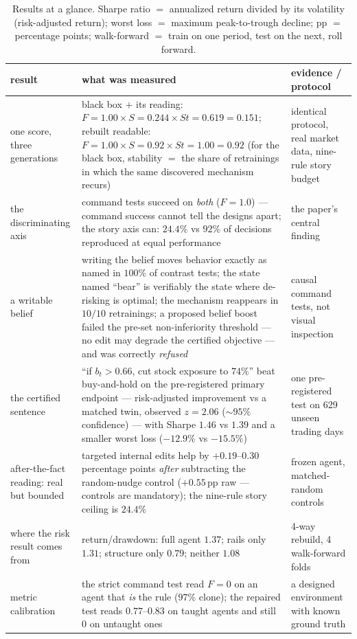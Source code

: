 \documentclass[11pt]{article}
\begin{document}
\begin{table}[h]
\centering\footnotesize
\begin{tabular}{p{3.7cm}p{6.4cm}p{4.0cm}}
\toprule
result & what was measured & evidence / protocol \\
\midrule
one score, three generations & black box $+$ its reading: $F{=}1.00 \times S{=}0.244
\times S\!t{=}0.619 = \mathbf{0.151}$; rebuilt readable: $F{=}1.00 \times S{=}0.92 \times
S\!t{=}1.00 = \mathbf{0.92}$ (for the black box, stability $=$ the share of retrainings in
which the same discovered mechanism recurs) & identical protocol, real market data, nine-rule
story budget \\[3pt]
the discriminating axis & command tests succeed on \emph{both} ($F=1.0$) --- command success cannot tell the designs apart; the story axis can: $24.4\%$ vs $92\%$ of decisions reproduced at equal performance & the paper's central finding \\[3pt]
a writable belief & writing the belief moves behavior exactly as named in $100\%$ of contrast tests; the state named ``bear'' is verifiably the state where de-risking is optimal; the mechanism reappears in $10/10$ retrainings; a proposed belief boost failed the pre-set non-inferiority threshold --- no edit may degrade
the certified objective --- and was correctly \emph{refused} & causal command tests, not visual inspection \\[3pt]
the certified sentence & ``if $b_t>0.66$, cut stock exposure to $74\%$'' beat buy-and-hold on the pre-registered
primary endpoint --- risk-adjusted improvement vs a matched twin, observed $z=2.06$
(${\sim}95\%$ confidence) --- with Sharpe $1.46$ vs $1.39$ and a smaller worst loss
($-12.9\%$ vs $-15.5\%$) & one pre-registered test on 629 unseen trading days \\[3pt]
after-the-fact reading: real but bounded & targeted internal edits help by $+0.19$--$0.30$ percentage points \emph{after} subtracting the random-nudge control ($+0.55$\,pp raw --- controls are mandatory); the nine-rule story ceiling is $24.4\%$ & frozen agent, matched-random controls \\[3pt]
where the risk result comes from & return/drawdown: full agent $1.37$; rails only $1.31$; structure only $0.79$; neither $1.08$ & 4-way rebuild, 4 walk-forward folds \\[3pt]
metric calibration & the strict command test read $F=0$ on an agent that \emph{is} the rule ($97\%$ clone); the repaired test reads $0.77$--$0.83$ on taught agents and still $0$ on untaught ones & a designed environment with known ground truth \\
\bottomrule
\end{tabular}
\caption{Results at a glance. Sharpe ratio $=$ annualized return divided by its volatility
(risk-adjusted return); worst loss $=$ maximum peak-to-trough decline; pp $=$ percentage
points; walk-forward $=$ train on one period, test on the next, roll forward.}
\label{tab:glance}
\end{table}
\end{document}
